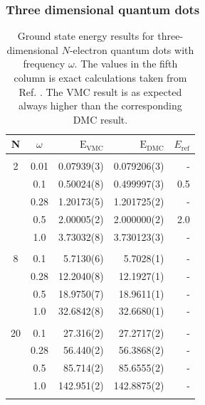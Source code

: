 \clearpage
\subsubsection{Three dimensional quantum dots}

\setlength{\tabcolsep}{1.05cm}
\begin{table}
\begin{center}
\begin{tabular}{cc|rrr}
    N     & $\omega$ & $\mathrm{E_{VMC}}$ & $\mathrm{E_{DMC}}$ & $E_\mathrm{ref}$\\
\hline\hline
\multicolumn{5}{c}{} \\
    2     &   0.01   & 0.07939(3)  & 0.079206(3) & -		\\
          &   0.1    & 0.50024(8)  & 0.499997(3) & 0.5        \\
          &   0.28   & 1.20173(5)  & 1.201725(2) & -		\\
          &   0.5    & 2.00005(2)  & 2.000000(2) & 2.0 \\
          &   1.0    & 3.73032(8)  & 3.730123(3) & - \\
\cline{2-5}
\multicolumn{5}{c}{} \\
    8     &   0.1    & 5.7130(6)   & 5.7028(1)   & - 		\\
          &   0.28   & 12.2040(8)  & 12.1927(1)  & -		\\
          &   0.5    & 18.9750(7)  & 18.9611(1)  & -\\
          &   1.0    & 32.6842(8)  & 32.6680(1)  & -\\
\cline{2-5}
\multicolumn{5}{c}{} \\
    20    &   0.1    & 27.316(2)   & 27.2717(2)   & - 		\\
          &   0.28   & 56.440(2)   & 56.3868(2)   & -		\\
          &   0.5    & 85.714(2)   & 85.6555(2)   & - \\
          &   1.0    & 142.951(2)  & 142.8875(2)  & -\\
\cline{2-5}
\multicolumn{5}{c}{} \\
\hline\hline
\end{tabular}
\caption{Ground state energy results for three-dimensional $N$-electron quantum dots with frequency $\omega$. The values in the fifth column is exact calculations taken from Ref. \cite{taut}. The VMC result is as expected always higher than the corresponding DMC result.}
\label{tab:QDotsResults3D}
\end{center}
\end{table}
\setlength{\tabcolsep}{6pt}

